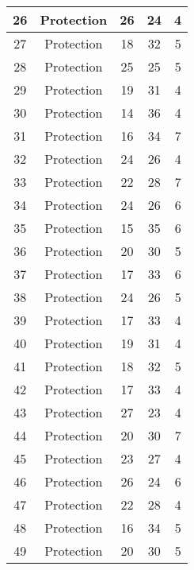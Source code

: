 \documentclass[results.tex]{subfiles}
\begin{document}
\begin{center}
\begin{tabular}{| c || c | c | c | c |}
    \hline
    26 & Protection & 26 & 24 & 4 \\ 
    \hline
    27 & Protection & 18 & 32 & 5 \\ 
    \hline
    28 & Protection & 25 & 25 & 5 \\ 
    \hline
    29 & Protection & 19 & 31 & 4 \\ 
    \hline
    30 & Protection & 14 & 36 & 4 \\ 
    \hline
    31 & Protection & 16 & 34 & 7 \\ 
    \hline
    32 & Protection & 24 & 26 & 4 \\ 
    \hline
    33 & Protection & 22 & 28 & 7 \\ 
    \hline
    34 & Protection & 24 & 26 & 6 \\ 
    \hline
    35 & Protection & 15 & 35 & 6 \\ 
    \hline
    36 & Protection & 20 & 30 & 5 \\ 
    \hline
    37 & Protection & 17 & 33 & 6 \\ 
    \hline
    38 & Protection & 24 & 26 & 5 \\ 
    \hline
    39 & Protection & 17 & 33 & 4 \\ 
    \hline
    40 & Protection & 19 & 31 & 4 \\ 
    \hline
    41 & Protection & 18 & 32 & 5 \\ 
    \hline
    42 & Protection & 17 & 33 & 4 \\ 
    \hline
    43 & Protection & 27 & 23 & 4 \\ 
    \hline
    44 & Protection & 20 & 30 & 7 \\ 
    \hline
    45 & Protection & 23 & 27 & 4 \\ 
    \hline
    46 & Protection & 26 & 24 & 6 \\ 
    \hline
    47 & Protection & 22 & 28 & 4 \\ 
    \hline
    48 & Protection & 16 & 34 & 5 \\ 
    \hline
    49 & Protection & 20 & 30 & 5 \\ 
    \hline   \end{tabular}
\end{center}
\end{document}
